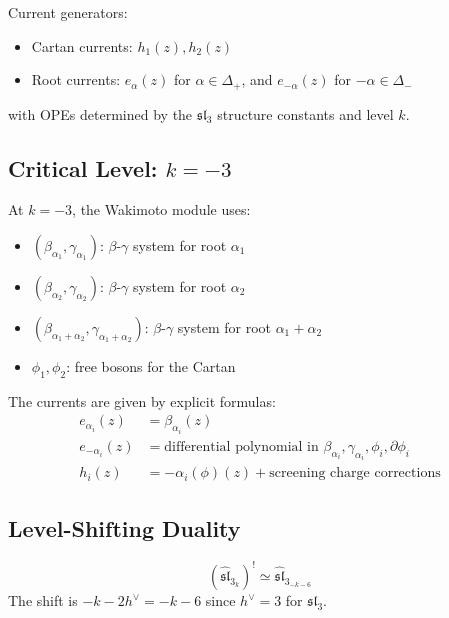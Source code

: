 \begin{definition}
Current generators:
\begin{itemize}
\item Cartan currents: $h_1(z), h_2(z)$
\item Root currents: $e_{\alpha}(z)$ for $\alpha \in \Delta_+$, and $e_{-\alpha}(z)$ for $-\alpha \in \Delta_-$
\end{itemize}
with OPEs determined by the $\mathfrak{sl}_3$ structure constants and level $k$.
\end{definition}

\subsection{Critical Level: $k = -3$}

\begin{theorem}
At $k = -3$, the Wakimoto module uses:
\begin{itemize}
\item $(\beta_{\alpha_1}, \gamma_{\alpha_1})$: $\beta$-$\gamma$ system for root $\alpha_1$
\item $(\beta_{\alpha_2}, \gamma_{\alpha_2})$: $\beta$-$\gamma$ system for root $\alpha_2$
\item $(\beta_{\alpha_1+\alpha_2}, \gamma_{\alpha_1+\alpha_2})$: $\beta$-$\gamma$ system for root $\alpha_1+\alpha_2$
\item $\phi_1, \phi_2$: free bosons for the Cartan
\end{itemize}

The currents are given by explicit formulas:
\begin{align}
e_{\alpha_i}(z) &= \beta_{\alpha_i}(z) \\
e_{-\alpha_i}(z) &= \text{differential polynomial in } \beta_{\alpha_i}, \gamma_{\alpha_i}, \phi_i, \partial\phi_i \\
h_i(z) &= -\alpha_i(\phi)(z) + \text{screening charge corrections}
\end{align}
\end{theorem}

\subsection{Level-Shifting Duality}

\begin{theorem}
\begin{equation}
(\widehat{\mathfrak{sl}}_3_k)^! \simeq \widehat{\mathfrak{sl}}_3_{-k-6}
\end{equation}
The shift is $-k - 2h^\vee = -k - 6$ since $h^\vee = 3$ for $\mathfrak{sl}_3$.
\end{theorem}

